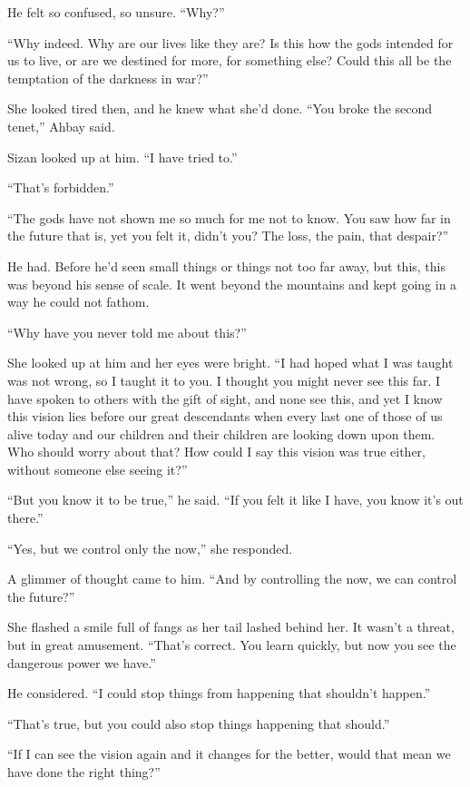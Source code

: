 He felt so confused, so unsure. ``Why?''

``Why indeed. Why are our lives like they are? Is this how the gods intended for us to live, or are we destined for more, for something else? Could this all be the temptation of the darkness in war?''

She looked tired then, and he knew what she'd done. ``You broke the second tenet,'' Ahbay said.

Sizan looked up at him. ``I have tried to.''

``That's forbidden.''

``The gods have not shown me so much for me not to know. You saw how far in the future that is, yet you felt it, didn't you? The loss, the pain, that despair?''

He had. Before he'd seen small things or things not too far away, but this, this was beyond his sense of scale. It went beyond the mountains and kept going in a way he could not fathom.

``Why have you never told me about this?''

She looked up at him and her eyes were bright. ``I had hoped what I was taught was not wrong, so I taught it to you. I thought you might never see this far. I have spoken to others with the gift of sight, and none see this, and yet I know this vision lies before our great descendants when every last one of those of us alive today and our children and their children are looking down upon them. Who should worry about that? How could I say this vision was true either, without someone else seeing it?''

``But you know it to be true,'' he said. ``If you felt it like I have, you know it's out there.''

``Yes, but we control only the now,'' she responded.

A glimmer of thought came to him. ``And by controlling the now, we can control the future?''

She flashed a smile full of fangs as her tail lashed behind her. It wasn't a threat, but in great amusement. ``That's correct. You learn quickly, but now you see the dangerous power we have.''

He considered. ``I could stop things from happening that shouldn't happen.''

``That's true, but you could also stop things happening that should.''

``If I can see the vision again and it changes for the better, would that mean we have done the right thing?''

